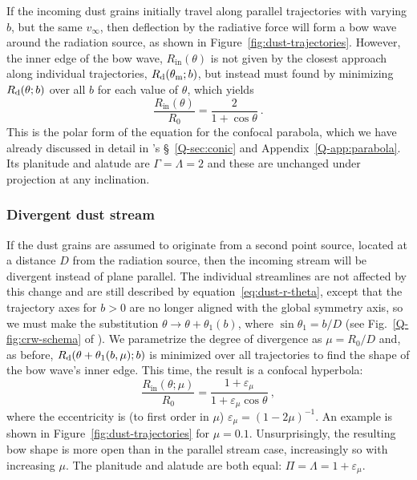 If the incoming dust grains initially travel along parallel
trajectories with varying \(b\), but the same \(v_\infty\), then deflection
by the radiative force will form a bow wave around the radiation
source, as shown in Figure~\ref{fig:dust-trajectories}.  However, the
inner edge of the bow wave, \(R_{\text{in}}(\theta)\) is not given by the
closest approach along individual trajectories, \(R_{\text{d}}(\theta_{\text{m}}; b)\),
but instead must found by minimizing \(R_{\text{d}}(\theta; b)\) over all
\(b\) for each value of \(\theta\), which yields
\begin{equation}
  \label{eq:dust-r-in}
  \frac{R_{\text{in}}(\theta)} {R_0} = \frac{2}{1 + \cos\theta} \ .
\end{equation}
This is the polar form of the equation for the confocal parabola,
which we have already discussed in detail in \PaperI{}'s
\S~\ref{Q-sec:conic} and Appendix~\ref{Q-app:parabola}.  Its planitude
and alatude are \(\Gamma = \Lambda = 2\) and these are unchanged under projection
at any inclination.



\subsubsection{Divergent dust stream}
\label{sec:dust-divergent}

If the dust grains are assumed to originate from a second point
source, located at a distance \(D\) from the radiation source, then
the incoming stream will be divergent instead of plane parallel.  The
individual streamlines are not affected by this change and are still
described by equation~\eqref{eq:dust-r-theta}, except that the
trajectory axes for \(b > 0\) are no longer aligned with the global
symmetry axis, so we must make the substitution
\(\theta \to \theta + \theta_1(b)\), where \(\sin \theta_1 = b / D\) (see
Fig.~\ref{Q-fig:crw-schema} of \PaperI{}). We parametrize the degree
of divergence as \(\mu = R_0 / D\) and, as before,
\(R_{\text{d}}(\theta + \theta_1(b, \mu); b)\) is minimized over all trajectories to
find the shape of the bow wave's inner edge.  This time, the result is
a confocal hyperbola:
\begin{equation}
  \label{eq:dust-divergent-r-in}
  \frac{R_{\text{in}}(\theta; \mu)} {R_0} = \frac{1 + \varepsilon_\mu}{1 + \varepsilon_\mu\cos\theta} \ ,
\end{equation}
where the eccentricity is (to first order in \(\mu\))
\( \varepsilon_\mu = (1 - 2\mu)^{-1}\).  An example is shown in
Figure~\ref{fig:dust-trajectories} for \(\mu = 0.1\).  Unsurprisingly,
the resulting bow shape is more open than in the parallel stream case,
increasingly so with increasing \(\mu\).  The planitude and alatude are
both equal: \(\Pi = \Lambda = 1 + \varepsilon_\mu\).


